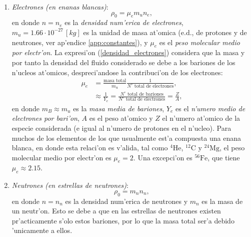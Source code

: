 \begin{enumerate}
 \item \emph{Electrones (en enanas blancas)}:
\begin{equation}\label{densidad_electrones}
\rho_0=\mu_e  m_u n_e,
\end{equation}
en donde $n=n_e$ es la \textit{densidad num'erica de electrones}, $m_u=1.66\cdot10^{-27}\,[kg]$ es la unidad de masa at'omica (e.d., de protones y de neutrones, ver ap'endice \ref{app:constantes}), y $\mu_e$ es el \textit{peso molecular medio por electr'on}. La expresi'on (\ref{densidad_electrones}) considera que la masa y por tanto la densidad del fluido considerado se debe a los bariones de los n'ucleos at'omicos, despreci'andose la contribuci'on de los electrones:
\begin{align}
 \mu_e&=\frac{\text{masa total}}{m_u}\frac{1}{N^{\circ}\text{ total de electrones}},\\
&\approx \frac{1}{Y_e}=\frac{N^{\circ}\text{ total de bariones}}{N^{\circ}\text{ total de electrones}}=\frac{Z}{A},
\end{align}
en donde $m_B\approx m_u$ es la \textit{masa media de bariones}, $Y_e$ es el \textit{n'umero medio de electrones por bari'on}, $A$ es el peso at'omico y $Z$ el n'umero at'omico de la especie considerada (e igual al n'umero de protones en el n'ucleo).  Para muchos de los elementos de los que usualmente est'a compuesta una enana blanca,  en donde esta relaci'on es v'alida, tal como ${}^4\textrm{He}$, ${}^{12}\textrm{C}$ y ${}^{24}\textrm{Mg}$, el peso molecular medio por electr'on es $\mu_e=2$. Una excepci'on es ${}^{56}\textrm{Fe}$, que tiene $\mu_e\approx2.15$.

\item \emph{Neutrones (en estrellas de neutrones)}:
\begin{equation}\label{densidad_neutrones}
\rho_0=  m_n n_n,
\end{equation}
en donde $n=n_n$ es la densidad num'erica de neutrones y $m_n$ es la masa de un neutr'on. Esto se debe a que en las estrellas de neutrones existen pr'acticamente s'olo estos bariones, por lo que la masa total ser'a debido 'unicamente a ellos.
\end{enumerate}

